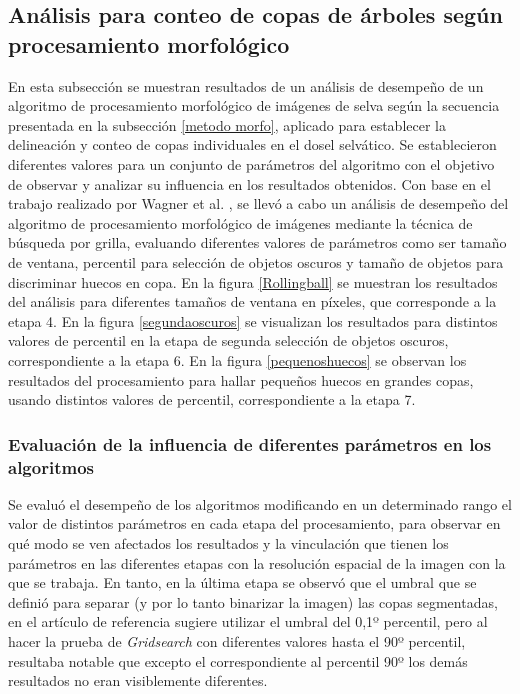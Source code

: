 \subsection{Análisis para conteo de copas de árboles según procesamiento morfológico} \label{resultados morfologico}
En esta subsección se muestran resultados de un análisis de desempeño de un algoritmo de procesamiento morfológico de imágenes de selva según la secuencia presentada en la subsección \ref{metodo morfo}, aplicado para establecer la delineación y conteo de copas individuales en el dosel selvático. Se establecieron diferentes valores para un conjunto de parámetros del algoritmo con el objetivo de observar y analizar su influencia en los resultados obtenidos.
Con base en el trabajo realizado por Wagner et al. \cite{hubert_wagner_individual_2018}, se llevó a cabo un análisis de desempeño del algoritmo de procesamiento morfológico de imágenes mediante la técnica de búsqueda por grilla, evaluando diferentes valores de parámetros como ser tamaño de ventana, percentil para selección de objetos oscuros y tamaño de objetos para discriminar huecos en copa. En la figura \ref{Rollingball} se muestran los resultados del análisis para diferentes tamaños de ventana en  píxeles, que corresponde a la etapa 4. En la figura \ref{segundaoscuros} se visualizan los resultados para distintos valores de percentil en la etapa de segunda selección de objetos oscuros, correspondiente a la etapa 6. En la figura \ref{pequenoshuecos} se observan los resultados del procesamiento para hallar pequeños huecos en grandes copas, usando distintos valores de percentil, correspondiente a la etapa 7. 



\subsubsection{Evaluación de la influencia de diferentes parámetros en los algoritmos}
Se evaluó el desempeño de los algoritmos modificando en un determinado rango el valor de distintos parámetros en cada etapa del procesamiento, para observar en qué modo se ven afectados los resultados y la vinculación que tienen los parámetros en las diferentes etapas con la resolución espacial de la imagen con la que se trabaja. En tanto, en la última etapa se observó que el umbral
que se definió para separar (y por lo tanto binarizar la imagen) las copas segmentadas, en el artículo de referencia sugiere utilizar el umbral del 0,1º percentil, pero al hacer la prueba de \textit{Gridsearch} con diferentes valores hasta el 90º percentil, resultaba notable que excepto el correspondiente al percentil 90º los demás resultados no eran visiblemente
diferentes.

